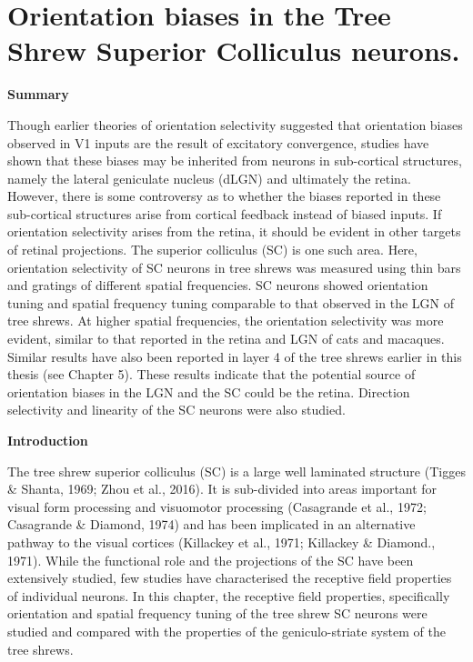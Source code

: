 \chapter [Superior Colliculus]{Orientation biases in the Tree Shrew Superior Colliculus neurons.}

\textbf{Summary}

Though earlier theories of orientation selectivity suggested that
orientation biases observed in V1 inputs are the result of excitatory
convergence, studies have shown that these biases may be inherited from
neurons in sub-cortical structures, namely the lateral geniculate
nucleus (dLGN) and ultimately the retina. However, there is some
controversy as to whether the biases reported in these sub-cortical
structures arise from cortical feedback instead of biased inputs. If
orientation selectivity arises from the retina, it should be evident in
other targets of retinal projections. The superior colliculus (SC) is
one such area. Here, orientation selectivity of SC neurons in tree
shrews was measured using thin bars and gratings of different spatial
frequencies. SC neurons showed orientation tuning and spatial frequency
tuning comparable to that observed in the LGN of tree shrews. At higher
spatial frequencies, the orientation selectivity was more evident,
similar to that reported in the retina and LGN of cats and macaques.
Similar results have also been reported in layer 4 of the tree shrews
earlier in this thesis (see Chapter 5). These results indicate that the
potential source of orientation biases in the LGN and the SC could be
the retina. Direction selectivity and linearity of the SC neurons were
also studied.

\textbf{Introduction}

The tree shrew superior colliculus (SC) is a large well laminated
structure (Tigges \& Shanta, 1969; Zhou et al., 2016). It is sub-divided
into areas important for visual form processing and visuomotor
processing (Casagrande et al., 1972; Casagrande \& Diamond, 1974) and
has been implicated in an alternative pathway to the visual cortices
(Killackey et al., 1971; Killackey \& Diamond., 1971). While the
functional role and the projections of the SC have been extensively
studied, few studies have characterised the receptive field properties
of individual neurons. In this chapter, the receptive field properties,
specifically orientation and spatial frequency tuning of the tree shrew
SC neurons were studied and compared with the properties of the
geniculo-striate system of the tree shrews.

